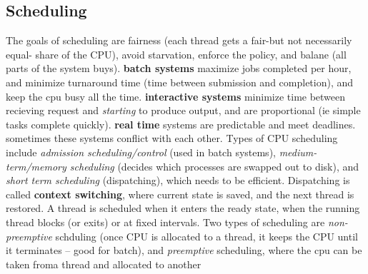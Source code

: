 \subsection*{Scheduling}
The goals of scheduling are fairness (each thread gets a fair-but not
necessarily equal- share of the CPU), avoid starvation, enforce the policy, and
balane (all parts of the system buys). \textbf{batch systems} maximize jobs
completed per hour, and minimize turnaround time (time between submission and
completion), and keep the cpu busy all the time. \textbf{interactive systems}
minimize time between recieving request and \textit{starting} to produce
output, and are proportional (ie simple tasks complete quickly). \textbf{real
time} systems are predictable and meet deadlines. sometimes these systems
conflict with each other. Types of CPU scheduling include \textit{admission
scheduling/control} (used in batch systems), \textit{medium-term/memory
scheduling} (decides which processes are swapped out to disk), and
\textit{short term scheduling} (dispatching), which needs to be efficient.
Dispatching is called \textbf{context switching}, where current state is
saved, and the next thread is restored. A thread is scheduled when it enters
the ready state, when the running thread blocks (or exits) or at fixed
intervals. Two types of scheduling are \textit{non-preemptive} schduling (once
CPU is allocated to a thread, it keeps the CPU until it terminates -- good for
batch), and \textit{preemptive} scheduling, where the cpu can be taken froma thread and
allocated to another
